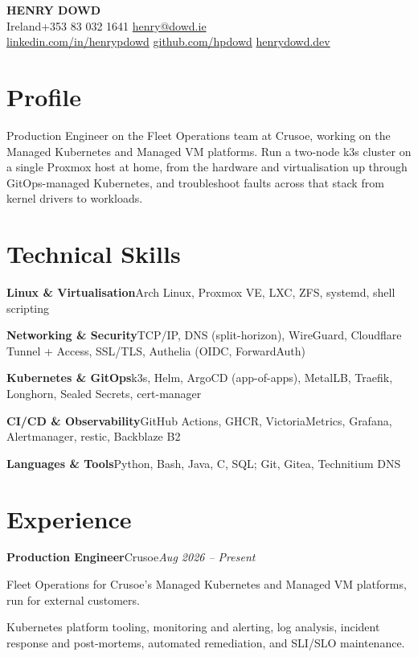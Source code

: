 \documentclass[a4paper,10pt]{article}
\newcommand{\cventry}[3]{\vspace{3pt}\noindent\textbf{#1}\enspace\textperiodcentered\enspace #2\hfill{\small\textit{\color{datesgrey}#3}}\par\vspace{1pt}}
\newcommand{\skillsline}[2]{\noindent\textbf{#1}\enspace\enspace #2\par\vspace{1pt}}
\begin{document}
\begin{center}
  {\LARGE\bfseries HENRY DOWD}\\\vspace{4pt}
  Ireland\enspace\textperiodcentered\enspace+353 83 032 1641\enspace\textperiodcentered\enspace
  \href{mailto:henry@dowd.ie}{henry@dowd.ie}\\
  \href{https://www.linkedin.com/in/henrypdowd/}{linkedin.com/in/henrypdowd}%
  \enspace\textperiodcentered\enspace
  \href{https://github.com/hpdowd}{github.com/hpdowd}%
  \enspace\textperiodcentered\enspace
  \href{https://henrydowd.dev}{henrydowd.dev}
\end{center}

\section{Profile}
Production Engineer on the Fleet Operations team at Crusoe, working on the Managed Kubernetes and Managed VM platforms. Run a two-node k3s cluster on a single Proxmox host at home, from the hardware and virtualisation up through GitOps-managed Kubernetes, and troubleshoot faults across that stack from kernel drivers to workloads.

\section{Technical Skills}
\skillsline{Linux \& Virtualisation}{Arch Linux, Proxmox VE, LXC, ZFS, systemd, shell scripting}
\skillsline{Networking \& Security}{TCP/IP, DNS (split-horizon), WireGuard, Cloudflare Tunnel + Access, SSL/TLS, Authelia (OIDC, ForwardAuth)}
\skillsline{Kubernetes \& GitOps}{k3s, Helm, ArgoCD (app-of-apps), MetalLB, Traefik, Longhorn, Sealed Secrets, cert-manager}
\skillsline{CI/CD \& Observability}{GitHub Actions, GHCR, VictoriaMetrics, Grafana, Alertmanager, restic, Backblaze B2}
\skillsline{Languages \& Tools}{Python, Bash, Java, C, SQL; Git, Gitea, Technitium DNS}

\section{Experience}
\cventry{Production Engineer}{Crusoe}{Aug 2026 -- Present}
\begin{cvitems}
  \item Fleet Operations for Crusoe's Managed Kubernetes and Managed VM platforms, run for external customers.
  \item Kubernetes platform tooling, monitoring and alerting, log analysis, incident response and post-mortems, automated remediation, and SLI/SLO maintenance.
\end{cvitems}
\end{document}

